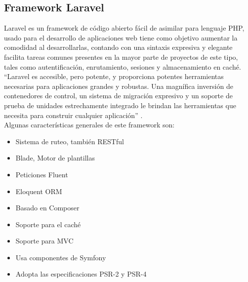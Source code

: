 

\subsection{Framework Laravel}

Laravel es un framework de código abierto fácil de asimilar para lenguaje PHP, usado para el desarrollo de aplicaciones web tiene como objetivo aumentar la comodidad al desarrollarlas, contando con una sintaxis expresiva y elegante facilita tareas comunes presentes en la mayor parte de proyectos de este tipo, tales como autentificación, enrutamiento, sesiones y almacenamiento en caché. \\

“Laravel es accesible, pero potente, y proporciona potentes herramientas necesarias para aplicaciones grandes y robustas. Una magnífica inversión de contenedores de control, un sistema de migración expresivo y un soporte de prueba de unidades estrechamente integrado le brindan las herramientas que necesita para construir cualquier aplicación'' \cite{Lara}.\\

Algunas características generales de este framework son:



\begin{itemize}
	\item Sistema de ruteo, también RESTful
	\item Blade, Motor de plantillas
	\item Peticiones Fluent
	\item Eloquent ORM
	\item Basado en Composer
	\item Soporte para el caché
	\item Soporte para MVC
	\item Usa componentes de Symfony
	\item Adopta las especificaciones PSR-2 y PSR-4	
\end{itemize}


